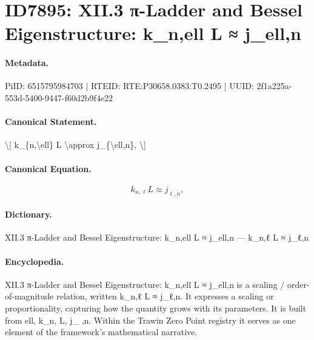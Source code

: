 \section*{ID7895: XII.3 π-Ladder and Bessel Eigenstructure: k\_n,ell L ≈ j\_ell,n}
\paragraph{Metadata.}
PiID: 6515795984703 | RTEID: RTE:P30658.0383:T0.2495 | UUID: 2f1a225a-553d-5400-9447-f60d2b9f4e22

\paragraph{Canonical Statement.}
\textbackslash{}[ k\_\{n,\textbackslash{}ell\} L \textbackslash{}approx j\_\{\textbackslash{}ell,n\}, \textbackslash{}]

\paragraph{Canonical Equation.}
\[
k_{n,\ell} L \approx j_{\ell,n},
\]

\paragraph{Dictionary.}
XII.3 π-Ladder and Bessel Eigenstructure: k\_n,ell L ≈ j\_ell,n — k\_n,ℓ L ≈ j\_ℓ,n

\paragraph{Encyclopedia.}
XII.3 π-Ladder and Bessel Eigenstructure: k\_n,ell L ≈ j\_ell,n is a scaling / order-of-magnitude relation, written k\_n,ℓ L ≈ j\_ℓ,n. It expresses a scaling or proportionality, capturing how the quantity grows with its parameters. It is built from ell, k\_n, L, j\_ ,n. Within the Trawin Zero Point registry it serves as one element of the framework's mathematical narrative.
